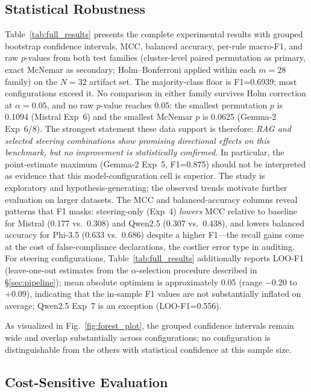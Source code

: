 \documentclass{ieeeaccess}
\begin{document}
\subsection{Statistical Robustness}

Table~\ref{tab:full_results} presents the complete experimental results with grouped bootstrap confidence intervals, MCC, balanced accuracy, per-rule macro-F1, and raw $p$-values from both test families (cluster-level paired permutation as primary, exact McNemar as secondary; Holm--Bonferroni applied within each $m=28$ family) on the $N=32$ artifact set. The majority-class floor is F1=0.6939; most configurations exceed it. No comparison in either family survives Holm correction at $\alpha=0.05$, and no raw $p$-value reaches 0.05: the smallest permutation $p$ is 0.1094 (Mistral Exp~6) and the smallest McNemar $p$ is 0.0625 (Gemma-2 Exp~6/8). The strongest statement these data support is therefore: \emph{RAG and selected steering combinations show promising directional effects on this benchmark, but no improvement is statistically confirmed.} In particular, the point-estimate maximum (Gemma-2 Exp~5, F1=0.875) should not be interpreted as evidence that this model-configuration cell is superior. The study is exploratory and hypothesis-generating; the observed trends motivate further evaluation on larger datasets. The MCC and balanced-accuracy columns reveal patterns that F1 masks: steering-only (Exp~4) \emph{lowers} MCC relative to baseline for Mistral (0.177 vs.\ 0.308) and Qwen2.5 (0.307 vs.\ 0.438), and lowers balanced accuracy for Phi-3.5 (0.633 vs.\ 0.686) despite a higher F1---the recall gains come at the cost of false-compliance declarations, the costlier error type in auditing. For steering configurations, Table~\ref{tab:full_results} additionally reports LOO-F1 (leave-one-out estimates from the $\alpha$-selection procedure described in §\ref{sec:pipeline}); mean absolute optimism is approximately 0.05 (range $-0.20$ to $+0.09$), indicating that the in-sample F1 values are not substantially inflated on average; Qwen2.5 Exp~7 is an exception (LOO-F1=0.556).

As visualized in Fig.~\ref{fig:forest_plot}, the grouped confidence intervals remain wide and overlap substantially across configurations; no configuration is distinguishable from the others with statistical confidence at this sample size.

\subsection{Cost-Sensitive Evaluation}
\end{document}
